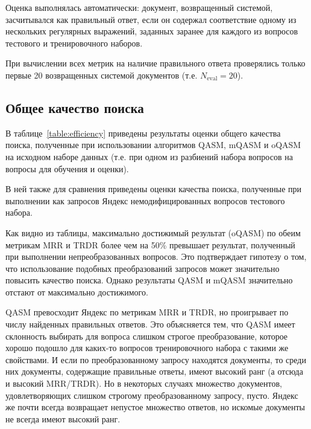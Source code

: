 \documentclass{article}
\begin{document}
Оценка выполнялась автоматически:
документ, возвращенный системой, засчитывался как правильный ответ,
если он содержал соответствие
одному из нескольких регулярных выражений, заданных заранее для каждого
из вопросов тестового и тренировочного наборов.

При вычислении всех метрик на наличие правильного ответа проверялись
только первые 20 возвращенных системой документов
(т.е. $N_{\text{eval}}=20$).



\subsection{Общее качество поиска}


В таблице~\ref{table:efficiency} приведены результаты оценки общего качества
поиска, полученные при использовании 
алгоритмов QASM, mQASM и oQASM
на исходном наборе данных
(т.е. при одном из разбиений набора вопросов на вопросы для обучения и оценки).

В ней также для сравнения приведены оценки
качества поиска, полученные при выполнении как запросов Яндекс
немодифицированных вопросов тестового набора.


Как видно из таблицы, максимально достижимый результат (oQASM)
по обеим метрикам MRR и TRDR более чем на 50\% превышает
результат, полученный при выполнении непреобразованных вопросов.
Это подтверждает гипотезу о том, что использование подобных преобразований 
запросов может значительно повысить качество поиска.
Однако результаты QASM и mQASM значительно отстают от максимально достижимого.

QASM превосходит Яндекс по метрикам
MRR и TRDR, но проигрывает по числу найденных правильных ответов. Это
объясняется тем, что QASM имеет склонность выбирать для вопроса слишком
строгое преобразование, которое хорошо подошло для каких-то вопросов
тренировочного набора с такими же свойствами. И если по преобразованному
запросу находятся документы, то среди них документы, содержащие правильные
ответы, имеют высокий ранг (а отсюда и высокий MRR/TRDR). Но в некоторых
случаях множество документов, удовлетворяющих слишком строгому
преобразованному запросу, пусто. Яндекс же почти всегда возвращает непустое
множество ответов, но искомые документы не всегда имеют высокий ранг.
\end{document}
